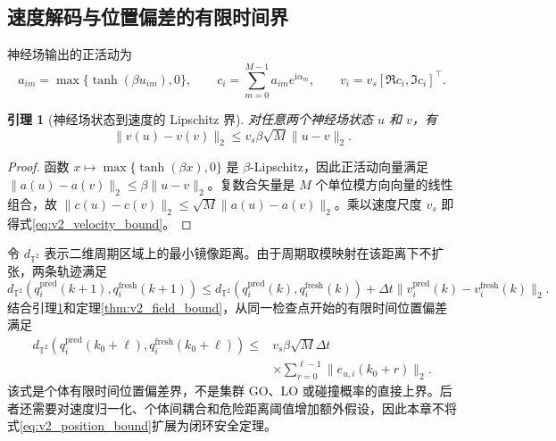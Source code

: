\documentclass[UTF8,fontset=windows,11pt]{ctexart}
\theoremstyle{cnplain}
\newtheorem{lemma}[theorem]{引理}
\numberwithin{equation}{section}
\newcommand{\Ttwo}{\mathbb T^2}
\begin{document}
\subsection{速度解码与位置偏差的有限时间界}

神经场输出的正活动为
\begin{equation}
 a_{im}=\max\{\tanh(\beta u_{im}),0\},
 \qquad
 c_i=\sum_{m=0}^{M-1}a_{im}e^{\mathrm i\alpha_m},
 \qquad
 v_i=v_s[\Re c_i,\Im c_i]^{\top}.
 \label{eq:v2_velocity_decode}
\end{equation}

\begin{lemma}[神经场状态到速度的 Lipschitz 界]
\label{lem:v2_velocity_bound}
对任意两个神经场状态 $u$ 和 $v$，有
\begin{equation}
 \|v(u)-v(v)\|_2
 \le v_s\beta\sqrt M\|u-v\|_2.
 \label{eq:v2_velocity_bound}
\end{equation}
\end{lemma}

\begin{proof}
函数 $x\mapsto\max\{\tanh(\beta x),0\}$ 是 $\beta$-Lipschitz，因此正活动向量满足
\(\|a(u)-a(v)\|_2\le\beta\|u-v\|_2\)。复数合矢量是 $M$ 个单位模方向向量的线性组合，故
\(\|c(u)-c(v)\|_2\le\sqrt M\|a(u)-a(v)\|_2\)。乘以速度尺度 $v_s$ 即得式\eqref{eq:v2_velocity_bound}。
\end{proof}

令 $d_{\Ttwo}$ 表示二维周期区域上的最小镜像距离。由于周期取模映射在该距离下不扩张，两条轨迹满足
\begin{equation}
 d_{\Ttwo}(q_i^{\mathrm{pred}}(k+1),q_i^{\mathrm{fresh}}(k+1))
 \le d_{\Ttwo}(q_i^{\mathrm{pred}}(k),q_i^{\mathrm{fresh}}(k))
 +\Delta t\|v_i^{\mathrm{pred}}(k)-v_i^{\mathrm{fresh}}(k)\|_2.
 \label{eq:v2_position_step}
\end{equation}
结合引理\ref{lem:v2_velocity_bound}和定理\ref{thm:v2_field_bound}，从同一检查点开始的有限时间位置偏差满足
\begin{equation}
 \begin{aligned}
 d_{\Ttwo}(q_i^{\mathrm{pred}}(k_0+\ell),q_i^{\mathrm{fresh}}(k_0+\ell))
 \le{}&v_s\beta\sqrt M\Delta t\\
 &\times\sum_{r=0}^{\ell-1}\|e_{u,i}(k_0+r)\|_2.
 \end{aligned}
 \label{eq:v2_position_bound}
\end{equation}
该式是个体有限时间位置偏差界，不是集群 GO、LO 或碰撞概率的直接上界。后者还需要对速度归一化、个体间耦合和危险距离阈值增加额外假设，因此本章不将式\eqref{eq:v2_position_bound}扩展为闭环安全定理。
\end{document}
